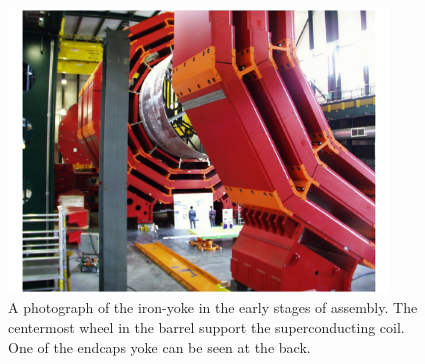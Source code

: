 \begin{figure}
 \centering
\includegraphics[width=0.9\textwidth]{CMS_DetectorFigures/Yoke.pdf}
\caption{A photograph of the iron-yoke in the early stages of
  assembly. The centermost wheel in the barrel support the
  superconducting coil. One of the endcaps yoke can be seen at the
  back.\label{fig:yoke}}
\end{figure}
